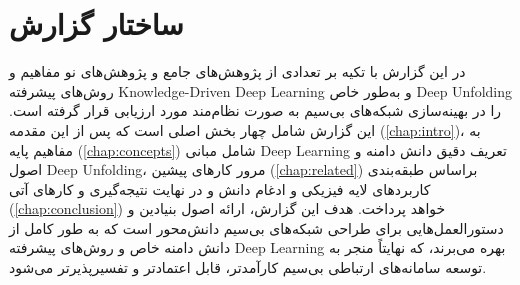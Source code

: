 \section{ساختار گزارش}
در این گزارش با تکیه بر تعدادی از پژوهش‌های جامع و پژوهش‌های نو مفاهیم و روش‌های پیشرفته
\gls{Knowledge-Driven Deep Learning}
و به‌طور خاص
\gls{Deep Unfolding}
را در بهینه‌سازی شبکه‌های بی‌سیم به صورت نظام‌مند مورد ارزیابی قرار گرفته است. این گزارش شامل چهار بخش اصلی است که پس از
 این مقدمه (\autoref{chap:intro})، به مفاهیم پایه (\autoref{chap:concepts}) شامل مبانی 
\gls{Deep Learning}
تعریف دقیق دانش دامنه و اصول 
\gls{Deep Unfolding}،
 مرور کارهای پیشین (\autoref{chap:related}) براساس طبقه‌بندی کاربردهای لایه فیزیکی و ادغام دانش  و در نهایت نتیجه‌گیری و کارهای آتی (\autoref{chap:conclusion}) خواهد پرداخت. هدف این گزارش، ارائه اصول بنیادین و دستورالعمل‌هایی برای طراحی شبکه‌های بی‌سیم دانش‌محور است که به طور کامل از دانش دامنه خاص و روش‌های پیشرفته 
\gls{Deep Learning}
بهره می‌برند، که نهایتاً منجر به توسعه سامانه‌های ارتباطی بی‌سیم کارآمدتر، قابل اعتمادتر و تفسیرپذیرتر می‌شود.

